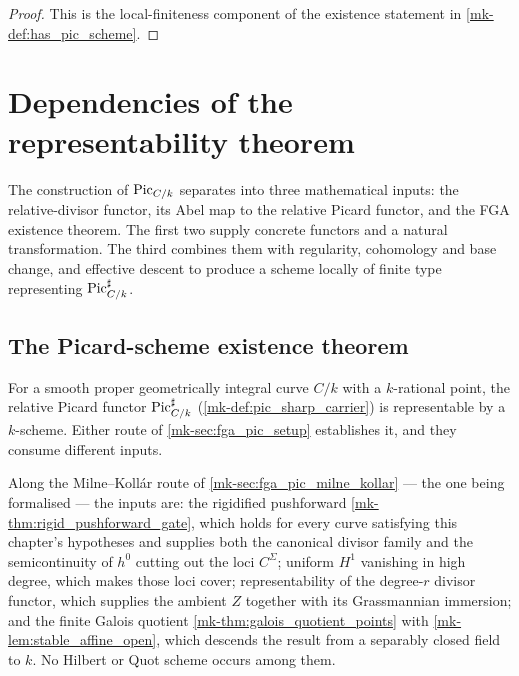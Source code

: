 \begin{proof}
  \leanok{}
  This is the local-finiteness component of the existence statement in
  \ref{mk-def:has_pic_scheme}.
\end{proof}

\section{Dependencies of the representability theorem}
\label{mk-sec:fga_pic_sorry_closure_order}

The construction of \(\operatorname{Pic}_{C/k}\) separates into three mathematical inputs:
the relative-divisor functor, its Abel map to the relative Picard functor, and
the FGA existence theorem. The first two supply concrete functors and a
natural transformation. The third combines them with regularity, cohomology
and base change, and effective descent to produce a scheme locally of finite
type representing \(\operatorname{Pic}^\sharp_{C/k}\).

\subsection{The Picard-scheme existence theorem}
\label{mk-subsec:sorry_has_pic_scheme}

For a
smooth proper geometrically integral curve \(C/k\) with a \(k\)-rational
point, the relative Picard functor \(\operatorname{Pic}^\sharp_{C/k}\)
(\ref{mk-def:pic_sharp_carrier}) is representable by a \(k\)-scheme. Either route
of \ref{mk-sec:fga_pic_setup} establishes it, and they consume different inputs.

Along the Milne--Koll\'ar route of \ref{mk-sec:fga_pic_milne_kollar} --- the one
being formalised --- the inputs are: the rigidified pushforward
\ref{mk-thm:rigid_pushforward_gate}, which holds for every curve satisfying this
chapter's hypotheses and supplies both the canonical divisor family and the
semicontinuity of \(h^0\) cutting out the loci \(C^\Sigma\); uniform \(H^1\) vanishing in high degree, which makes those loci
cover; representability of the degree-\(r\) divisor functor, which supplies the
ambient \(Z\) together with its Grassmannian immersion; and the finite Galois
quotient \ref{mk-thm:galois_quotient_points} with
\ref{mk-lem:stable_affine_open}, which descends the result from a separably closed
field to \(k\). No Hilbert or Quot scheme occurs among them.

